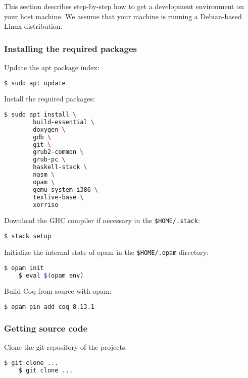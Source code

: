 \documentclass[10pt,a4paper,titlepage]{refart}
\begin{document}
This section describes step-by-step how to get a development environment on your
host machine. We assume that your machine is running a Debian-based Linux
distribution.

\subsubsection{Installing the required packages}

Update the apt package index:

\begin{lstlisting}[language=bash]
    $ sudo apt update
\end{lstlisting}

Install the required packages:

\begin{lstlisting}[language=bash]
    $ sudo apt install \
        build-essential \
        doxygen \
        gdb \
        git \
        grub2-common \
        grub-pc \
        haskell-stack \
        nasm \
        opam \
        qemu-system-i386 \
        texlive-base \
        xorriso
\end{lstlisting}

Download the GHC compiler if necessary in the \texttt{\$HOME/.stack}:

\begin{lstlisting}[language=bash]
    $ stack setup
\end{lstlisting}

Initialize the internal state of opam in the \texttt{\$HOME/.opam} directory:

\begin{lstlisting}[language=bash]
    $ opam init
    $ eval $(opam env)
\end{lstlisting}

Build Coq from source with opam:

\begin{lstlisting}[language=bash]
    $ opam pin add coq 8.13.1
\end{lstlisting}

\subsubsection{Getting source code}

Clone the git repository of the projects:

\begin{lstlisting}[language=bash]
    $ git clone ...
    $ git clone ...
\end{lstlisting}
\end{document}
